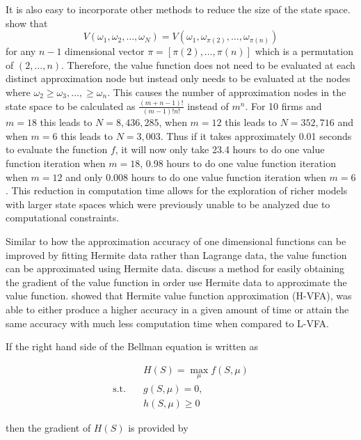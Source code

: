 \documentclass[12pt]{article}
\begin{document}
It is also easy to incorporate other methods to reduce the size of the state space. \citet{1992_Pakes_McGuire_NBER} show that
\begin{equation*}
  V(\omega_1,\omega_2,\dots,\omega_N)=V(\omega_1,\omega_{\pi(2)},\dots,\omega_{\pi(n)})
\end{equation*}
for any $n-1$ dimensional vector $\pi=[\pi(2),\dots,\pi(n)]$ which is a permutation of $(2,\dots,n)$. Therefore, the value function does not need to be evaluated at each distinct approximation node but instead only needs to be evaluated at the nodes where $\omega_2\geq \omega_3,\dots,\geq \omega_n$. This causes the number of approximation nodes in the state space to be calculated as $\frac{(m+n-1)!}{(m-1)!n!}$ instead of $m^n$. For 10 firms and $m=18$ this leads to $N=8,436,285$, when $m=12$ this leads to $N=352,716$ and when $m=6$ this leads to $N=3,003$. Thus if it takes approximately 0.01 seconds to evaluate the function $f$, it will now only take 23.4 hours to do one value function iteration when $m=18$, 0.98 hours to do one value function iteration when $m=12$ and only 0.008 hours to do one value function iteration when $m=6$. This reduction in computation time allows for the exploration of richer models with larger state spaces which were previously unable to be analyzed due to computational constraints.

Similar to how the approximation accuracy of one dimensional functions can be improved by fitting Hermite data rather than Lagrange data, the value function can be approximated using Hermite data. \citet{2015_Judd_Cai} discuss a method for easily obtaining the gradient of the value function in order use Hermite data to approximate the value function. \citet{2015_Judd_Cai} showed that Hermite value function approximation (H-VFA), was able to either produce a higher accuracy in a given amount of time or attain the same accuracy with much less computation time when compared to L-VFA.

If the right hand side of the Bellman equation is written as

\begin{equation}
  \begin{aligned}
    & H(S)=\max_{\mu} f(S,\mu) \\
    \text{s.t.}\quad & g(S, \mu)=0,\\
    & h(S,\mu) \geq 0
  \end{aligned}
  \label{equationA}
\end{equation}

then the gradient of $H(S)$ is provided by
\end{document}
